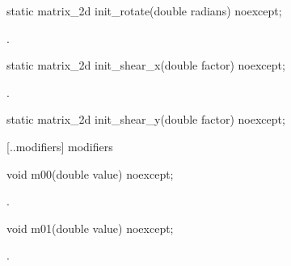 \begin{itemdecl}
static matrix_2d init_rotate(double radians) noexcept;
\end{itemdecl}
\begin{itemdescr}
	\pnum
	\returns
	.
\end{itemdescr}

\begin{itemdecl}
static matrix_2d init_shear_x(double factor) noexcept;
\end{itemdecl}
\begin{itemdescr}
	\pnum
	\returns
	.
\end{itemdescr}

\begin{itemdecl}
static matrix_2d init_shear_y(double factor) noexcept;
\end{itemdecl}
\begin{itemdescr}
	\pnum
	\returns
\end{itemdescr}

 [\iotwod.\matrixtwod.modifiers] { modifiers}

\begin{itemdecl}
	void m00(double value) noexcept;
\end{itemdecl}
\begin{itemdescr}
	\pnum
	\postconditions
	.
	
\end{itemdescr}

\begin{itemdecl}
	void m01(double value) noexcept;
\end{itemdecl}
\begin{itemdescr}
	\pnum
	\postconditions
	.
	
\end{itemdescr}

